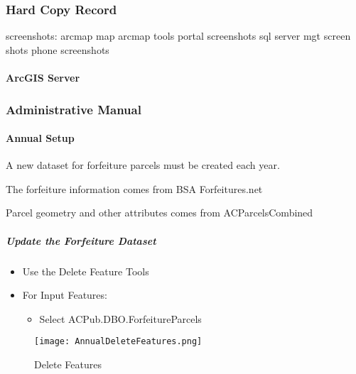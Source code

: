  \subsubsection{Hard Copy Record}
 screenshots:
 arcmap map
 arcmap tools
 portal screenshots
 sql server mgt screen shots
 phone screenshots
 \paragraph{ArcGIS Server}
 \clearpage
 \subsubsection{Administrative Manual}
 \vspace{.25in}

 \paragraph{Annual Setup}

 A new dataset for forfeiture parcels must be created each year.
 \vspace{.1in}

 \noindent The forfeiture information comes from BSA Forfeitures.net
 \vspace{.1in}

 \noindent Parcel geometry and other attributes comes from ACParcelsCombined
 \vspace{.25in}

 \subparagraph{Update the Forfeiture Dataset}

 \vspace{.25in}

 \begin{itemize}
 \item {\Large Use the Delete Feature Tools}
 \item {\Large For Input Features:}
 \begin{itemize}
 \item Select ACPub.DBO.ForfeitureParcels
 \end{itemize}
 \end{itemize}
 \vspace{.1in}

 \begin{figure}[h!]
 \centering
     \texttt{[image: AnnualDeleteFeatures.png]}
 \caption{Delete Features}
 \end{figure}
 \vspace{.15in}

